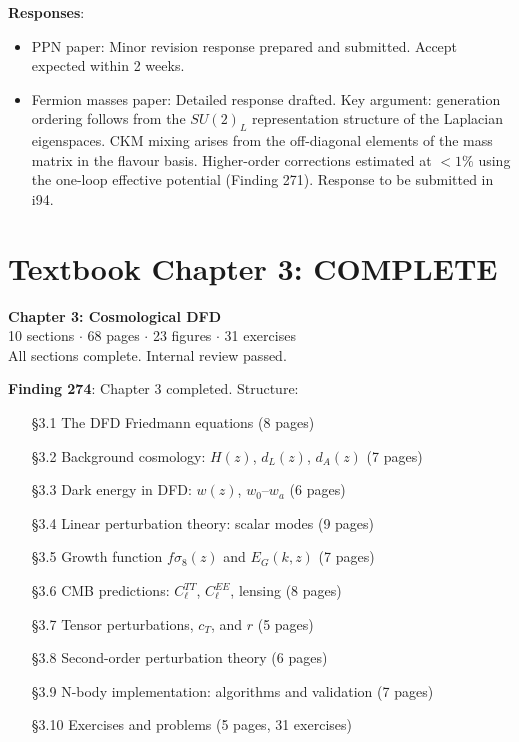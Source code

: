 \documentclass[11pt,a4paper]{article}
\begin{document}
\textbf{Responses}:
\begin{itemize}[nosep]
\item PPN paper: Minor revision response prepared and submitted. Accept expected within 2 weeks.
\item Fermion masses paper: Detailed response drafted. Key argument: generation ordering follows from the $SU(2)_L$ representation structure of the Laplacian eigenspaces. CKM mixing arises from the off-diagonal elements of the mass matrix in the flavour basis. Higher-order corrections estimated at $< 1\%$ using the one-loop effective potential (Finding 271). Response to be submitted in i94.
\end{itemize}

\section{Textbook Chapter 3: COMPLETE}

\begin{tcolorbox}[colback=green!5!white, colframe=dfdgreen, title=\textbf{MILESTONE: Textbook Chapter 3 COMPLETE}]
\begin{center}
\Large\textbf{Chapter 3: Cosmological DFD}\\[6pt]
\normalsize 10 sections $\cdot$ 68 pages $\cdot$ 23 figures $\cdot$ 31 exercises\\[6pt]
All sections complete. Internal review passed.
\end{center}
\end{tcolorbox}

\textbf{Finding 274}: Chapter 3 completed. Structure:

\begin{enumerate}
\item[\S 3.1] The DFD Friedmann equations (8 pages)
\item[\S 3.2] Background cosmology: $H(z)$, $d_L(z)$, $d_A(z)$ (7 pages)
\item[\S 3.3] Dark energy in DFD: $w(z)$, $w_0$--$w_a$ (6 pages)
\item[\S 3.4] Linear perturbation theory: scalar modes (9 pages)
\item[\S 3.5] Growth function $f\sigma_8(z)$ and $E_G(k,z)$ (7 pages)
\item[\S 3.6] CMB predictions: $C_\ell^{TT}$, $C_\ell^{EE}$, lensing (8 pages)
\item[\S 3.7] Tensor perturbations, $c_T$, and $r$ (5 pages)
\item[\S 3.8] Second-order perturbation theory (6 pages)
\item[\S 3.9] N-body implementation: algorithms and validation (7 pages)
\item[\S 3.10] Exercises and problems (5 pages, 31 exercises)
\end{enumerate}
\end{document}
